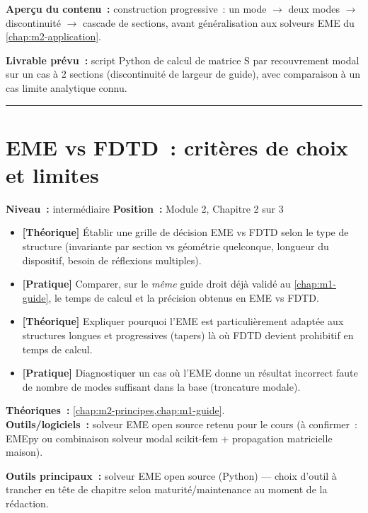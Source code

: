 \noindent\textbf{Aperçu du contenu~:} construction progressive~: un mode $\to$ deux modes $\to$ discontinuité $\to$ cascade de sections, avant généralisation aux solveurs EME du \cref{chap:m2-application}.

\noindent\textbf{Livrable prévu~:} script Python de calcul de matrice S par recouvrement modal sur un cas à 2 sections (discontinuité de largeur de guide), avec comparaison à un cas limite analytique connu.

\bigskip\hrule\bigskip

\chapter{EME vs FDTD~: critères de choix et limites}
\label{chap:m2-vs-fdtd}

\noindent\textbf{Niveau~:} intermédiaire \hfill \textbf{Position~:} Module 2, Chapitre 2 sur 3

\begin{objectifs}
\begin{itemize}[leftmargin=1.4em]
  \item \textbf{[Théorique]} Établir une grille de décision EME vs FDTD selon le type de structure (invariante par section vs géométrie quelconque, longueur du dispositif, besoin de réflexions multiples).
  \item \textbf{[Pratique]} Comparer, sur le \emph{même} guide droit déjà validé au \cref{chap:m1-guide}, le temps de calcul et la précision obtenus en EME vs FDTD.
  \item \textbf{[Théorique]} Expliquer pourquoi l'EME est particulièrement adaptée aux structures longues et progressives (tapers) là où FDTD devient prohibitif en temps de calcul.
  \item \textbf{[Pratique]} Diagnostiquer un cas où l'EME donne un résultat incorrect faute de nombre de modes suffisant dans la base (troncature modale).
\end{itemize}
\end{objectifs}

\begin{prerequis}
\textbf{Théoriques~:} \cref{chap:m2-principes,chap:m1-guide}.\\
\textbf{Outils/logiciels~:} solveur EME open source retenu pour le cours (à confirmer~: EMEpy ou combinaison solveur modal scikit-fem + propagation matricielle maison).
\end{prerequis}

\noindent\textbf{Outils principaux~:} solveur EME open source (Python) — choix d'outil à trancher en tête de chapitre selon maturité/maintenance au moment de la rédaction.

